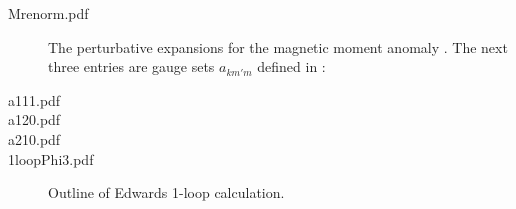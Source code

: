 \begin{description}
\begin{description}
  \item[Mrenorm.pdf] 
The perturbative expansions for the magnetic moment anomaly .
The next three entries are gauge sets $a_{km'm}$ defined in :
  \item[a111.pdf]  
  \item[a120.pdf]  
  \item[a210.pdf]  
  \item[1loopPhi3.pdf] Outline of Edwards 1-loop calculation.
\end{description}


\end{description}

\printbibliography[heading=subbibintoc,title={References}]


\renewcommand{\ssp}{a}
